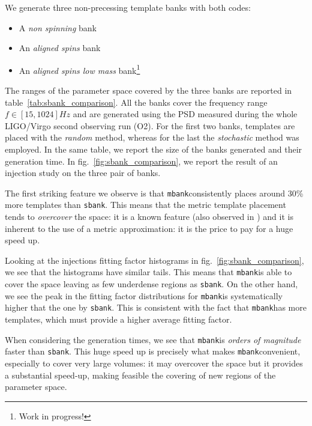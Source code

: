 \documentclass[twocolumn,showpacs,preprintnumbers,nofootinbib,prd,
superscriptaddress,10pt]{revtex4-2}
\newcommand{\mbank}{\texttt{mbank}}
\begin{document}
We generate three non-precessing template banks with both codes:
\begin{itemize}
	\item A {\it non spinning} bank
	\item An {\it aligned spins} bank
	\item An {\it aligned spins low mass} bank\footnote{Work in progress!}
\end{itemize}
The ranges of the parameter space covered by the three banks are reported in table~\ref{tab:sbank_comparison}. All the banks cover the frequency range $f\in [15,1024] Hz$ and are generated using the PSD measured during the whole LIGO/Virgo second observing run (O2).
For the first two banks, templates are placed with the {\it random} method, whereas for the last the {\it stochastic} method was employed.
In the same table, we report the size of the banks generated and their generation time. In fig.~\ref{fig:sbank_comparison}, we report the result of an injection study on the three pair of banks.

The first striking feature we observe is that \mbank consistently places around 30\% more templates than \texttt{sbank}. This means that the metric template placement tends to \textit{overcover} the space: it is a known feature (also observed in \cite{}) and it is inherent to the use of a metric approximation: it is the price to pay for a huge speed up.

Looking at the injections fitting factor histograms in fig.~\ref{fig:sbank_comparison}, we see that the histograms have similar tails. This means that \mbank is able to cover the space leaving as few underdense regions as \texttt{sbank}. On the other hand, we see the peak in the fitting factor distributions for \mbank is systematically higher that the one by \texttt{sbank}. This is consistent with the fact that \mbank has more templates, which must provide a higher average fitting factor.

When considering the generation times, we see that \mbank is {\it orders of magnitude} faster than \texttt{sbank}. This huge speed up is precisely what makes \mbank convenient, especially to cover very large volumes: it may overcover the space but it provides a substantial speed-up, making feasible the covering of new regions of the parameter space.

\end{document}
